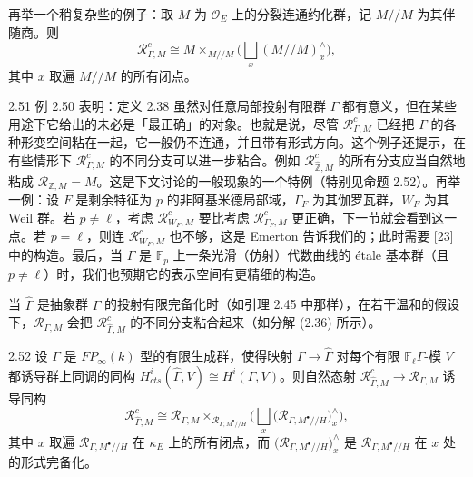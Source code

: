 再举一个稍复杂些的例子：取 $M$ 为 $\mathcal O_E$ 上的分裂连通约化群，记 $M/\!/M$ 为其伴随商。则
\[
\mathcal R^c_{\Gamma,M}\cong M\times_{M/\!/M}\Big(\bigsqcup_x (M/\!/M)^{\wedge}_x\Big),
\]
其中 $x$ 取遍 $M/\!/M$ 的所有闭点。

\begin{rem}{2.51}
例 2.50 表明：定义 2.38 虽然对任意局部投射有限群 $\Gamma$ 都有意义，但在某些用途下它给出的未必是「最正确」的对象。也就是说，尽管 $\mathcal R^c_{\Gamma,M}$ 已经把 $\Gamma$ 的各种形变空间粘在一起，它一般仍不连通，并且带有形式方向。这个例子还提示，在有些情形下 $\mathcal R^c_{\Gamma,M}$ 的不同分支可以进一步粘合。例如 $\mathcal R^c_{\widehat{\mathbb Z},M}$ 的所有分支应当自然地粘成 $\mathcal R_{\mathbb Z,M}=M$。这是下文讨论的一般现象的一个特例（特别见命题 2.52）。再举一例：设 $F$ 是剩余特征为 $p$ 的非阿基米德局部域，$\Gamma_F$ 为其伽罗瓦群，$W_F$ 为其 Weil 群。若 $p\neq\ell$，考虑 $\mathcal R^c_{W_F,M}$ 要比考虑 $\mathcal R^c_{\Gamma_F,M}$ 更正确，下一节就会看到这一点。若 $p=\ell$，则连 $\mathcal R^c_{W_F,M}$ 也不够，这是 Emerton 告诉我们的；此时需要 [23] 中的构造。最后，当 $\Gamma$ 是 $\mathbb F_p$ 上一条光滑（仿射）代数曲线的 étale 基本群（且 $p\neq\ell$）时，我们也预期它的表示空间有更精细的构造。
\end{rem}

当 $\widehat\Gamma$ 是抽象群 $\Gamma$ 的投射有限完备化时（如引理 2.45 中那样），在若干温和的假设下，$\mathcal R_{\Gamma,M}$ 会把 $\mathcal R^c_{\widehat\Gamma,M}$ 的不同分支粘合起来（如分解 (2.36) 所示）。

\begin{prop}{2.52}
设 $\Gamma$ 是 $FP_\infty(k)$ 型的有限生成群，使得映射 $\Gamma\to\widehat\Gamma$ 对每个有限 $\mathbb F_\ell\Gamma$-模 $V$ 都诱导群上同调的同构 $H^i_{cts}(\widehat\Gamma,V)\cong H^i(\Gamma,V)$。则自然态射 $\mathcal R^c_{\widehat\Gamma,M}\to\mathcal R_{\Gamma,M}$ 诱导同构
\[
\mathcal R^c_{\widehat\Gamma,M}\cong \mathcal R_{\Gamma,M}\times_{\mathcal R_{\Gamma,M^{\bullet}/\!/H}}\Big(\bigsqcup_x\big(\mathcal R_{\Gamma,M^{\bullet}/\!/H}\big)^{\wedge}_x\Big),
\]
其中 $x$ 取遍 $\mathcal R_{\Gamma,M^{\bullet}/\!/H}$ 在 $\kappa_E$ 上的所有闭点，而 $\big(\mathcal R_{\Gamma,M^{\bullet}/\!/H}\big)^{\wedge}_x$ 是 $\mathcal R_{\Gamma,M^{\bullet}/\!/H}$ 在 $x$ 处的形式完备化。
\end{prop}

